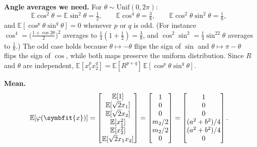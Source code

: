 \documentclass[11pt]{article}
\newcommand{\bm}[1]{\symbfit{#1}}
\newcommand{\vx}{\bm{x}}
\begin{document}
\textbf{Angle averages we need.} For $\theta\sim\mathrm{Unif}(0,2\pi)$:
\[
\mathbb E\cos^2\theta=\mathbb E\sin^2\theta=\tfrac12,\qquad
\mathbb E\cos^4\theta=\tfrac38,\qquad \mathbb E\cos^2\theta\sin^2\theta=\tfrac18,
\]
and $\mathbb E[\cos^p\theta\sin^q\theta]=0$ whenever $p$ or $q$ is odd. (For instance
$\cos^4=\big(\tfrac{1+\cos2\theta}{2}\big)^2$ averages to $\tfrac14(1+\tfrac12)=\tfrac38$, and
$\cos^2\sin^2=\tfrac14\sin^22\theta$ averages to $\tfrac18$.) The odd case holds because
$\theta\mapsto-\theta$ flips the sign of $\sin$ and $\theta\mapsto\pi-\theta$ flips the sign of $\cos$, while both
maps preserve the uniform distribution. Since $R$ and $\theta$ are independent,
$\mathbb E[x_1^px_2^q]=\mathbb E[R^{p+q}]\,\mathbb E[\cos^p\theta\sin^q\theta]$.

\textbf{Mean.}
\[
\mathbb E[\varphi(\vx)]=\begin{bmatrix}\mathbb E[1]\\\mathbb E[\sqrt2x_1]\\\mathbb E[\sqrt2x_2]\\\mathbb E[x_1^2]\\\mathbb E[x_2^2]\\\mathbb E[\sqrt2x_1x_2]\end{bmatrix}
=\begin{bmatrix}1\\0\\0\\m_2/2\\m_2/2\\0\end{bmatrix}=\begin{bmatrix}1\\0\\0\\(a^2+b^2)/4\\(a^2+b^2)/4\\0\end{bmatrix}.
\]
\end{document}
